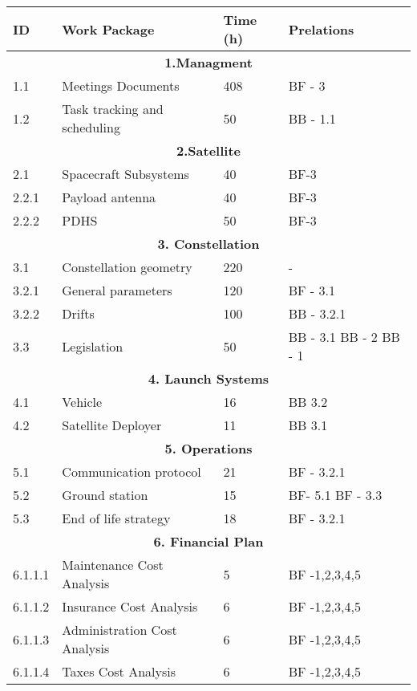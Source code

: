 \begin{longtable}{ | p{1.3cm} | p{7cm} | p{3cm} | p{3.5cm} |}
\hline

\textbf{ID }& \textbf{Work Package} & \textbf{Time (h)} & \textbf{Prelations} \\ \hline
\multicolumn{4}{|c|}{\textbf{1.Managment}} \\ \hline
1.1 & Meetings Documents & 408 & BF - 3 \\ \hline
1.2 & Task tracking and scheduling & 50 & BB - 1.1 \\ \hline
\multicolumn{4}{|c|}{\textbf{2.Satellite}} \\ \hline
2.1 & Spacecraft Subsystems & 40 & BF-3 \\ \hline
2.2.1 & Payload antenna & 40 & BF-3 \\ \hline
2.2.2 & PDHS & 50 & BF-3 \\ \hline
\multicolumn{4}{|c|}{\textbf{3. Constellation}} \\ \hline
3.1 & Constellation geometry & 220 & - \\ \hline
3.2.1 & General parameters & 120 & BF - 3.1 \\ \hline
3.2.2 & Drifts & 100 & BB - 3.2.1 \\ \hline
3.3 & Legislation & 50 & BB - 3.1 \newline
BB - 2 \newline 
BB - 1 \\ \hline
\multicolumn{4}{|c|}{\textbf{4. Launch Systems}} \\ \hline
4.1 & Vehicle & 16 & BB 3.2 \\ \hline
4.2 & Satellite Deployer & 11 & BB 3.1  \\ \hline
\multicolumn{4}{|c|}{\textbf{5. Operations}} \\ \hline
5.1 & Communication protocol & 21 & BF - 3.2.1 \\ \hline
5.2 & Ground station & 15 & BF- 5.1 \newline BF - 3.3 \\ \hline
5.3 & End of life strategy & 18 & BF - 3.2.1 \\
\hline
\multicolumn{4}{|c|}{\textbf{6. Financial Plan}} \\ \hline
6.1.1.1 & Maintenance Cost Analysis & 5 & BF -1,2,3,4,5 \\ \hline
6.1.1.2 & Insurance Cost Analysis & 6 & BF -1,2,3,4,5  \\ \hline
6.1.1.3 & Administration Cost Analysis & 6 & BF -1,2,3,4,5 \\ \hline
6.1.1.4 & Taxes Cost Analysis  & 6 & BF -1,2,3,4,5  \\ \hline

\end{longtable}
